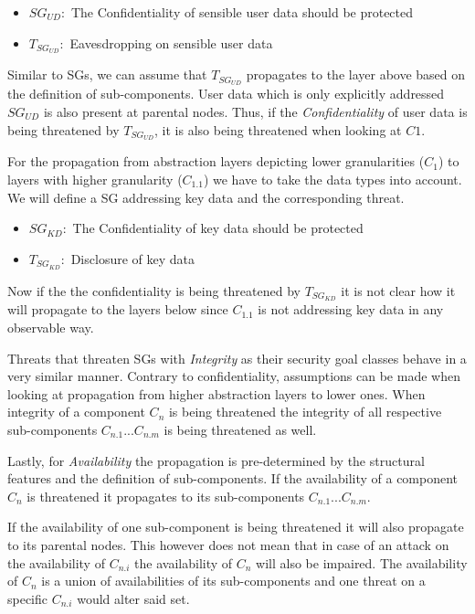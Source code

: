 \begin{itemize}
\item[]\textbf{$SG_{UD}:$} The Confidentiality of sensible user data should be protected
\item[]\textbf{$T_{SG_{UD}}:$} Eavesdropping on sensible user data
\end{itemize}

Similar to SGs, we can assume that $T_{SG_{UD}}$ propagates to the layer above based on the definition of sub-components. User data which is only explicitly addressed $SG_{UD}$ is also present at parental nodes. Thus, if the \textit{Confidentiality} of user data is being threatened by $T_{SG_{UD}}$, it is also being threatened when looking at $C1$.

For the propagation from abstraction layers depicting lower granularities ($C_1$) to layers with higher granularity ($C_{1.1}$) we have to take the data types into account. We will define a SG addressing key data and the corresponding threat.

\begin{itemize}
\item[]\textbf{$SG_{KD}:$} The Confidentiality of key data should be protected
\item[]\textbf{$T_{SG_{KD}}:$} Disclosure of key data
\end{itemize}

Now if the the confidentiality is being threatened by $T_{SG_{KD}}$ it is not clear how it will propagate to the layers below since $C_{1.1}$ is not addressing key data in any observable way. 

Threats that threaten SGs with \textit{Integrity} as their security goal classes behave in a very similar manner. Contrary to confidentiality, assumptions can be made when looking at propagation from higher abstraction layers to lower ones. When integrity of a component $C_n$ is being threatened the integrity of all respective sub-components $C_{n.1} ... C_{n.m}$ is being threatened as well.

Lastly, for \textit{Availability} the propagation is pre-determined by the structural features and the definition of sub-components. If the availability of a component $C_n$ is threatened it propagates to its sub-components $C_{n.1} ... C_{n.m}$. 

If the availability of one sub-component is being threatened it will also propagate to its parental nodes. This however does not mean that in case of an attack on the availability of $C_{n.i}$ the availability of $C_n$ will also be impaired. The availability of $C_n$ is a union of availabilities of its sub-components and one threat on a specific $C_{n.i}$ would alter said set.

